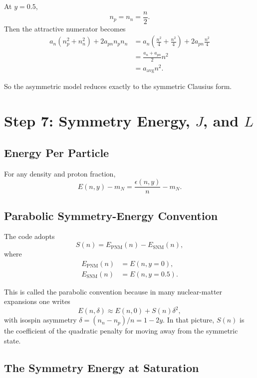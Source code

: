 \documentclass[11pt]{article}
\begin{document}
At $y=0.5$,
\[
n_p=n_n=\frac{n}{2}.
\]
Then the attractive numerator becomes
\begin{align}
a_n(n_p^2+n_n^2)+2a_{pn}n_pn_n
&=
a_n\left(\frac{n^2}{4}+\frac{n^2}{4}\right)
+2a_{pn}\frac{n^2}{4} \\
&=
\frac{a_n+a_{pn}}{2}n^2 \\
&=
a_{\mathrm{avg}}n^2.
\end{align}

So the asymmetric model reduces exactly to the symmetric Clausius form.

\section{Step 7: Symmetry Energy, \texorpdfstring{$J$}{J}, and \texorpdfstring{$L$}{L}}

\subsection{Energy Per Particle}

For any density and proton fraction,
\begin{equation}
E(n,y)-m_N
=
\frac{\epsilon(n,y)}{n}-m_N.
\end{equation}

\subsection{Parabolic Symmetry-Energy Convention}

The code adopts
\begin{equation}
S(n)=E_{\mathrm{PNM}}(n)-E_{\mathrm{SNM}}(n),
\end{equation}
where
\begin{align}
E_{\mathrm{PNM}}(n) &= E(n,y=0), \\
E_{\mathrm{SNM}}(n) &= E(n,y=0.5).
\end{align}

This is called the parabolic convention because in many nuclear-matter
expansions one writes
\[
E(n,\delta)\approx E(n,0)+S(n)\delta^2,
\]
with isospin asymmetry $\delta=(n_n-n_p)/n=1-2y$. In that picture,
$S(n)$ is the coefficient of the quadratic penalty for moving away from the
symmetric state.

\subsection{The Symmetry Energy at Saturation}
\end{document}
